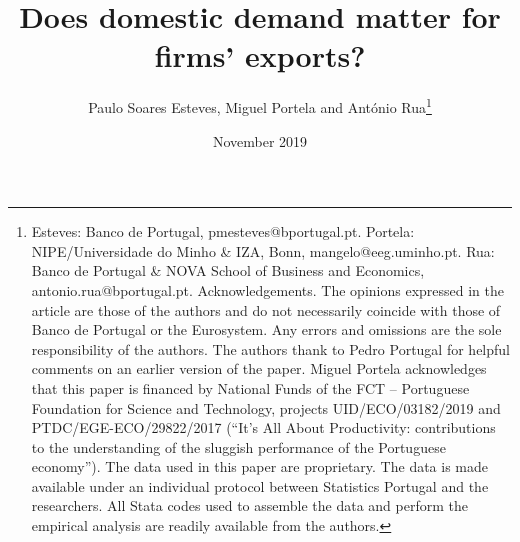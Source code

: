\documentclass[a4paper,12pt]{article}
\begin{document}
\title{Does domestic demand matter for firms' exports?}
\author{Paulo Soares Esteves, Miguel Portela and Ant\'{o}nio Rua\thanks{%
Esteves: Banco de Portugal, pmesteves@bportugal.pt. Portela:
NIPE/Universidade do Minho \& IZA, Bonn, mangelo@eeg.uminho.pt. Rua: Banco de Portugal \& NOVA School of Business and Economics, antonio.rua@bportugal.pt.
Acknowledgements. The opinions expressed in the article are those of the authors and do not necessarily coincide with those of Banco de Portugal or the Eurosystem. Any errors and omissions are the sole responsibility of the authors. The authors thank to Pedro Portugal for helpful comments on an earlier version of the paper. Miguel Portela acknowledges that this paper is financed by National Funds of the FCT – Portuguese Foundation for Science and Technology, projects UID/ECO/03182/2019 and PTDC/EGE-ECO/29822/2017 (``It's All About Productivity: contributions to the understanding of the sluggish performance of the Portuguese economy''). The data used in this paper are proprietary. The data is made available under an individual protocol between Statistics Portugal and the researchers. All Stata codes used to assemble the data and perform the empirical analysis are readily available from the authors.}}

\date{November 2019}

\maketitle






\begin{abstract}
\end{abstract}
\end{document}

